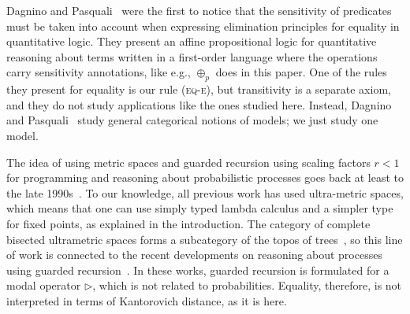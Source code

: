 \documentclass[a4paper,UKenglish,cleveref, autoref, thm-restate]{lipics-v2021}
\begin{document}
Dagnino and Pasquali~\cite{DagninoP22} were the first to notice that the sensitivity of predicates must
be taken into account when expressing elimination principles for equality in quantitative logic.
They present an affine propositional logic for quantitative reasoning about terms written in a first-order
language where the operations carry sensitivity annotations, like e.g., $\oplus_p$ does in this paper. 
One of the rules they present for equality is our rule (\textsc{eq-e}), but transitivity is a separate axiom, and they do not study applications 
like the ones studied here. 
Instead, Dagnino and Pasquali~\cite{DagninoP22} study general categorical notions of models; we just study one
model. 

The idea of using metric spaces and guarded recursion using scaling factors $r<1$
for programming and reasoning about probabilistic processes goes back at least to the late 
1990s~\cite{VinkR99,BaierK00}.  
To our knowledge, all previous work has used ultra-metric spaces, which means that one
can use simply typed lambda calculus and a simpler type for fixed points, as explained
in the introduction. The category of complete bisected ultrametric spaces forms a subcategory
of the topos of trees~\cite{ToT}, so this line of work is connected to the recent developments
on reasoning about processes using guarded recursion~\cite{BBBG018,KristensenMV22}. 
In these works, guarded recursion is formulated for a modal operator $\rhd$, which is
not related to probabilities. Equality, therefore, is not interpreted in terms of Kantorovich distance, as it is here.
\end{document}
